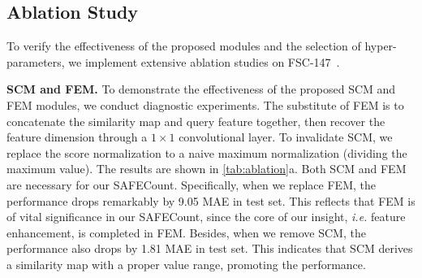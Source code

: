 \documentclass[10pt,twocolumn,letterpaper]{article}
\newcommand{\method}{SAFECount\xspace}
\begin{document}
\subsection{Ablation Study} \label{subsec:ablation}
To verify the effectiveness of the proposed modules and the selection of hyper-parameters, we implement extensive ablation studies on FSC-147~\cite{famnet}. 

\vspace{2pt}\noindent \textbf{SCM and FEM.} 
To demonstrate the effectiveness of the proposed SCM and FEM modules, we conduct diagnostic experiments. 
The substitute of FEM is to concatenate the similarity map and query feature together, then recover the feature dimension through a $1\times1$ convolutional layer. 
To invalidate SCM, we replace the score normalization to a naive maximum normalization (dividing the maximum value). 
The results are shown in \cref{tab:ablation}a. 
Both SCM and FEM are necessary for our \method. 
Specifically, when we replace FEM, the performance drops remarkably by 9.05 MAE in test set. 
This reflects that FEM is of vital significance in our \method, since the core of our insight, \textit{i.e.} feature enhancement, is completed in FEM. 
Besides, when we remove SCM, the performance also drops by 1.81 MAE in test set. 
This indicates that SCM derives a similarity map with a proper value range, promoting the performance. 
\end{document}
